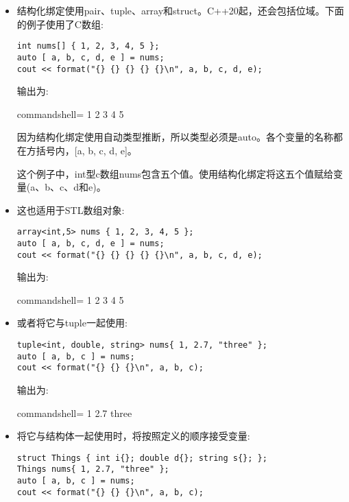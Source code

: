 \begin{itemize}
\item 
结构化绑定使用pair、tuple、array和struct。C++20起，还会包括位域。下面的例子使用了C数组:

\begin{lstlisting}[style=styleCXX]
int nums[] { 1, 2, 3, 4, 5 };
auto [ a, b, c, d, e ] = nums;
cout << format("{} {} {} {} {}\n", a, b, c, d, e);
\end{lstlisting}

输出为:

\begin{tcblisting}{commandshell={}}
1 2 3 4 5
\end{tcblisting}

因为结构化绑定使用自动类型推断，所以类型必须是auto。各个变量的名称都在方括号内，[a, b, c, d, e]。

这个例子中，int型c数组nums包含五个值。使用结构化绑定将这五个值赋给变量(a、b、c、d和e)。

\item 
这也适用于STL数组对象:

\begin{lstlisting}[style=styleCXX]
array<int,5> nums { 1, 2, 3, 4, 5 };
auto [ a, b, c, d, e ] = nums;
cout << format("{} {} {} {} {}\n", a, b, c, d, e);
\end{lstlisting}

输出为:

\begin{tcblisting}{commandshell={}}
1 2 3 4 5
\end{tcblisting}

\item 
或者将它与tuple一起使用:

\begin{lstlisting}[style=styleCXX]
tuple<int, double, string> nums{ 1, 2.7, "three" };
auto [ a, b, c ] = nums;
cout << format("{} {} {}\n", a, b, c);
\end{lstlisting}

输出为:

\begin{tcblisting}{commandshell={}}
1 2.7 three
\end{tcblisting}

\item 
将它与结构体一起使用时，将按照定义的顺序接受变量:

\begin{lstlisting}[style=styleCXX]
struct Things { int i{}; double d{}; string s{}; };
Things nums{ 1, 2.7, "three" };
auto [ a, b, c ] = nums;
cout << format("{} {} {}\n", a, b, c);
\end{lstlisting}


\end{itemize}
